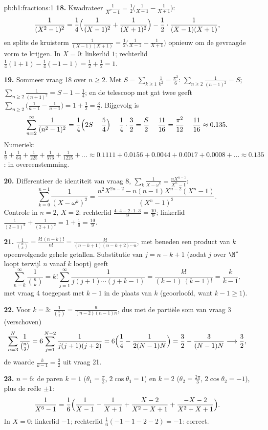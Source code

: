 \begin{solution}{pb:b1:fractions:1}
\textbf{18.} Kwadrateer $\frac1{X^2-1} = \frac12\bigl(\frac1{X-1} -
\frac1{X+1}\bigr)$:
\[
\frac1{(X^2-1)^2} = \frac14\Bigl(\frac1{(X-1)^2} +
\frac1{(X+1)^2}\Bigr) - \frac12\cdot\frac1{(X-1)(X+1)} ,
\]
en splits de kruisterm $\frac1{(X-1)(X+1)} = \frac12\bigl(\frac1{X-1} -
\frac1{X+1}\bigr)$ opnieuw om de gevraagde vorm te krijgen. In $X = 0$:
linkerlid $1$; rechterlid $\frac14(1 + 1) - \frac14(-1 - 1) = \frac12 +
\frac12 = 1$.

\textbf{19.} Sommeer vraag 18 over $n \geq 2$. Met $S =
\sum_{k\geq1}\frac1{k^2} = \frac{\pi^2}6$: $\sum_{n\geq2}
\frac1{(n-1)^2} = S$; $\sum_{n\geq2}\frac1{(n+1)^2} = S - 1 - \frac14$;
en de telescoop met gat twee geeft $\sum_{n\geq2}\bigl( \frac1{n-1} -
\frac1{n+1}\bigr) = 1 + \frac12 = \frac32$. Bijgevolg is
\[
\sum_{n=2}^{\infty}\frac1{(n^2-1)^2}
= \frac14\Bigl(2S - \frac54\Bigr) - \frac14\cdot\frac32
= \frac S2 - \frac{11}{16}
= \frac{\pi^2}{12} - \frac{11}{16} \approx 0.135 .
\]
Numeriek: $\frac19 + \frac1{64} + \frac1{225} + \frac1{576} +
\frac1{1225} + \dots \approx 0.1111 + 0.0156 + 0.0044 + 0.0017 + 0.0008 +
\dots \approx 0.135$: in overeenstemming.

\textbf{20.} Differentieer de identiteit van vraag 8,
$\sum_k\frac1{X-\omega^k} = \frac{nX^{n-1}}{X^n-1}$:
\[
\sum_{k=0}^{n-1}\frac1{(X - \omega^k)^2}
= \frac{n^2X^{2n-2} - n(n-1)X^{n-2}(X^n - 1)}{(X^n - 1)^2} .
\]
Controle in $n = 2$, $X = 2$: rechterlid $\frac{4\cdot4 -
2\cdot1\cdot3}{9} = \frac{10}9$; linkerlid $\frac1{(2-1)^2} +
\frac1{(2+1)^2} = 1 + \frac19 = \frac{10}9$.

\textbf{21.} $\frac1{\binom nk} = \frac{k!\,(n-k)!}{n!} =
\frac{k!}{(n-k+1)(n-k+2)\cdots n}$, met beneden een product van $k$
opeenvolgende gehele getallen. Substitutie van $j = n - k + 1$ (zodat $j$
over $\N^*$ loopt terwijl $n$ vanaf $k$ loopt) geeft
\[
\sum_{n=k}^{\infty}\frac1{\binom nk}
= k!\sum_{j=1}^{\infty}\frac1{j(j+1)\cdots(j+k-1)}
= \frac{k!}{(k-1)\,(k-1)!} = \frac{k}{k-1} ,
\]
met vraag 4 toegepast met $k - 1$ in de plaats van $k$ (geoorloofd, want
$k - 1 \geq 1$).

\textbf{22.} Voor $k = 3$: $\frac1{\binom n3} = \frac6{(n-2)(n-1)n}$,
dus met de partiële som van vraag 3 (verschoven)
\[
\sum_{n=3}^{N}\frac1{\binom n3}
= 6\sum_{j=1}^{N-2}\frac1{j(j+1)(j+2)}
= 6\Bigl(\frac14 - \frac1{2(N-1)N}\Bigr)
= \frac32 - \frac3{(N-1)N}
\longrightarrow \frac32 ,
\]
de waarde $\frac k{k-1} = \frac32$ uit vraag 21.

\textbf{23.} $n = 6$: de paren $k = 1$ ($\theta_1 = \frac\pi3$,
$2\cos\theta_1 = 1$) en $k = 2$ ($\theta_2 = \frac{2\pi}3$,
$2\cos\theta_2 = -1$), plus de reële  $\pm1$:
\[
\frac1{X^6-1} = \frac16\Bigl(\frac1{X-1} - \frac1{X+1}
+ \frac{X - 2}{X^2 - X + 1}
+ \frac{-X - 2}{X^2 + X + 1}\Bigr) .
\]
In $X = 0$: linkerlid $-1$; rechterlid $\frac16(-1 - 1 - 2 - 2) = -1$:
correct.


\end{solution}

